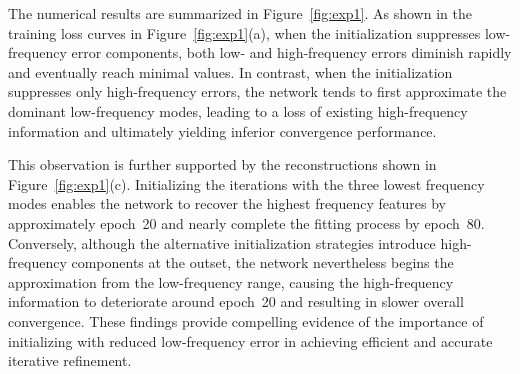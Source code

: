 \documentclass[preprint,numbers,sort&compress]{elsarticle}
\begin{document}
			
			
			The numerical results are summarized in Figure~\ref{fig:exp1}. As shown in the training loss curves in Figure~\ref{fig:exp1}(a), when the initialization suppresses low-frequency error components, both low- and high-frequency errors diminish rapidly and eventually reach minimal values. In contrast, when the initialization suppresses only high-frequency errors, the network tends to first approximate the dominant low-frequency modes, leading to a loss of existing high-frequency information and ultimately yielding inferior convergence performance.
			
			This observation is further supported by the reconstructions shown in Figure~\ref{fig:exp1}(c). Initializing the iterations with the three lowest frequency modes enables the network to recover the highest frequency features by approximately epoch~20 and nearly complete the fitting process by epoch~80. Conversely, although the alternative initialization strategies introduce high-frequency components at the outset, the network nevertheless begins the approximation from the low-frequency range, causing the high-frequency information to deteriorate around epoch~20 and resulting in slower overall convergence. These findings provide compelling evidence of the importance of initializing with reduced low-frequency error in achieving efficient and accurate iterative refinement.
			
\end{document}
